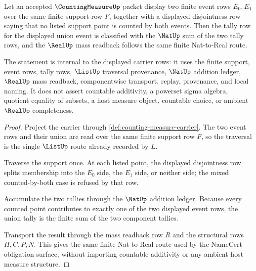 \begin{theorem}
\label{thm:counting-measure-finite-disjoint-union-additivity}
Let an accepted $\CountingMeasureUp$ packet display two finite event rows $E_0,E_1$ over the same finite support row $F$, together with a displayed disjointness row saying that no listed support point is counted by both events. Then the tally row for the displayed union event is classified with the $\NatUp$ sum of the two tally rows, and the $\RealUp$ mass readback follows the same finite Nat-to-Real route.

The statement is internal to the displayed carrier rows: it uses the finite support, event rows, tally rows, $\ListUp$ traversal provenance, $\NatUp$ addition ledger, $\RealUp$ mass readback, componentwise transport, replay, provenance, and local naming. It does not assert countable additivity, a powerset sigma algebra, quotient equality of subsets, a host measure object, countable choice, or ambient $\RealUp$ completeness.
\end{theorem}
\begin{proof}
Project the carrier through \autoref{def:counting-measure-carrier}. The two event rows and their union are read over the same finite support row $F$, so the traversal is the single $\ListUp$ route already recorded by $L$.

Traverse the support once. At each listed point, the displayed disjointness row splits membership into the $E_0$ side, the $E_1$ side, or neither side; the mixed counted-by-both case is refused by that row.

Accumulate the two tallies through the $\NatUp$ addition ledger. Because every counted point contributes to exactly one of the two displayed event rows, the union tally is the finite sum of the two component tallies.

Transport the result through the mass readback row $R$ and the structural rows $H,C,P,N$. This gives the same finite Nat-to-Real route used by the NameCert obligation surface, without importing countable additivity or any ambient host measure structure.
\end{proof}


